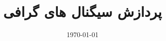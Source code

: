 \documentclass[11pt]{article}
\title{پردازش سیگنال های گرافی}
\date{\today}
\begin{document}
\maketitlepage
\maketitlestart


\end{document}
